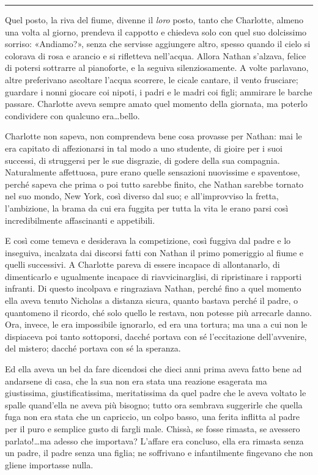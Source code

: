 \documentclass[a4paper,oneside,11pt]{memoir}
\begin{document}
\plainbreak{1}

Quel posto, la riva del fiume, divenne il \emph{loro} posto, tanto che
Charlotte, almeno una volta al giorno, prendeva il cappotto e chiedeva solo con
quel suo dolcissimo sorriso: «Andiamo?», senza che servisse aggiungere altro,
spesso quando il cielo si colorava di rosa e arancio e si rifletteva nell'acqua.
Allora Nathan s'alzava, felice di potersi sottrarre al pianoforte, e la seguiva
silenziosamente. A volte parlavano, altre preferivano ascoltare l'acqua
scorrere, le cicale cantare, il vento frusciare; guardare i nonni giocare coi
nipoti, i padri e le madri coi figli; ammirare le barche passare. Charlotte
aveva sempre amato quel momento della giornata, ma poterlo condividere con
qualcuno era\dots bello.

Charlotte non sapeva, non comprendeva bene cosa provasse per Nathan: mai le era
capitato di affezionarsi in tal modo a uno studente, di gioire per i suoi
successi, di struggersi per le sue disgrazie, di godere della sua compagnia.
Naturalmente affettuosa, pure erano quelle sensazioni nuovissime e spaventose,
perché sapeva che prima o poi tutto sarebbe finito, che Nathan sarebbe tornato
nel suo mondo, New York, così diverso dal suo; e all'improvviso la fretta,
l'ambizione, la brama da cui era fuggita per tutta la vita le erano parsi così
incredibilmente affascinanti e appetibili.

E così come temeva e desiderava la competizione, così fuggiva dal padre e lo
inseguiva, incalzata dai discorsi fatti con Nathan il primo pomeriggio al fiume
e quelli successivi. A Charlotte pareva di essere incapace di allontanarlo, di
dimenticarlo e ugualmente incapace di riavvicinarglisi, di ripristinare i
rapporti infranti. Di questo incolpava e ringraziava Nathan, perché fino a quel
momento ella aveva tenuto Nicholas a distanza sicura, quanto bastava perché il
padre, o quantomeno il ricordo, ché solo quello le restava, non potesse più
arrecarle danno. Ora, invece, le era impossibile ignorarlo, ed era una tortura;
ma una a cui non le dispiaceva poi tanto sottoporsi, dacché portava con sé
l'eccitazione dell'avvenire, del mistero; dacché portava con sé la speranza.

Ed ella aveva un bel da fare dicendosi che dieci anni prima aveva fatto bene ad
andarsene di casa, che la sua non era stata una reazione esagerata ma
giustissima, giustificatissima, meritatissima da quel padre che le aveva voltato
le spalle quand'ella ne aveva più bisogno; tutto ora sembrava suggerirle che
quella fuga non era stata che un capriccio, un colpo basso, una ferita inflitta
al padre per il puro e semplice gusto di fargli male. Chissà, se fosse rimasta,
se avessero parlato!\dots ma adesso che importava? L'affare era concluso, ella
era rimasta senza un padre, il padre senza una figlia; ne soffrivano e
infantilmente fingevano che non gliene importasse nulla.
\end{document}
